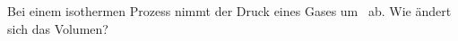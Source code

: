 Bei einem isothermen Prozess nimmt der Druck eines Gases um \dprO\ ab. Wie ändert sich das Volumen?
